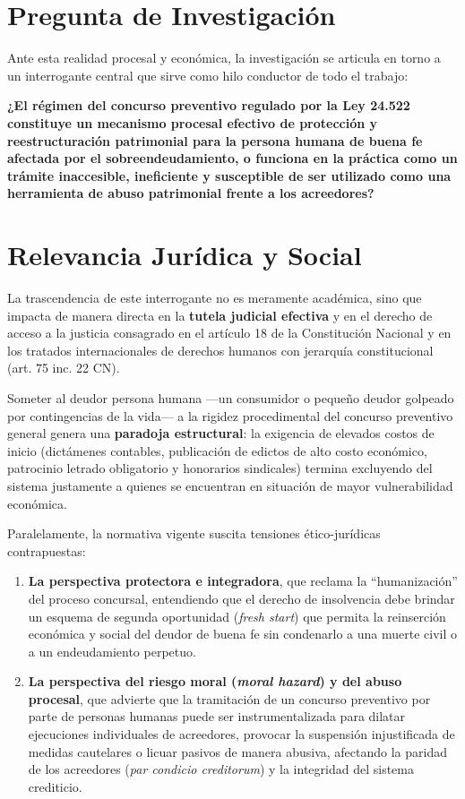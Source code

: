\documentclass[12pt,oneside]{book}
\begin{document}
\section{Pregunta de Investigación}

Ante esta realidad procesal y económica, la investigación se articula en torno a un interrogante central que sirve como hilo conductor de todo el trabajo:

\begin{important}
\textbf{¿El régimen del concurso preventivo regulado por la Ley 24.522 constituye un mecanismo procesal efectivo de protección y reestructuración patrimonial para la persona humana de buena fe afectada por el sobreendeudamiento, o funciona en la práctica como un trámite inaccesible, ineficiente y susceptible de ser utilizado como una herramienta de abuso patrimonial frente a los acreedores?}
\end{important}

\section{Relevancia Jurídica y Social}

La trascendencia de este interrogante no es meramente académica, sino que impacta de manera directa en la \textbf{tutela judicial efectiva} y en el derecho de acceso a la justicia consagrado en el artículo 18 de la Constitución Nacional y en los tratados internacionales de derechos humanos con jerarquía constitucional (art. 75 inc. 22 CN).

Someter al deudor persona humana ---un consumidor o pequeño deudor golpeado por contingencias de la vida--- a la rigidez procedimental del concurso preventivo general genera una \textbf{paradoja estructural}: la exigencia de elevados costos de inicio (dictámenes contables, publicación de edictos de alto costo económico, patrocinio letrado obligatorio y honorarios sindicales) termina excluyendo del sistema justamente a quienes se encuentran en situación de mayor vulnerabilidad económica.

Paralelamente, la normativa vigente suscita tensiones ético-jurídicas contrapuestas:

\begin{enumerate}
    \item \textbf{La perspectiva protectora e integradora}, que reclama la ``humanización'' del proceso concursal, entendiendo que el derecho de insolvencia debe brindar un esquema de segunda oportunidad (\textit{fresh start}) que permita la reinserción económica y social del deudor de buena fe sin condenarlo a una muerte civil o a un endeudamiento perpetuo.

    \item \textbf{La perspectiva del riesgo moral (\textit{moral hazard}) y del abuso procesal}, que advierte que la tramitación de un concurso preventivo por parte de personas humanas puede ser instrumentalizada para dilatar ejecuciones individuales de acreedores, provocar la suspensión injustificada de medidas cautelares o licuar pasivos de manera abusiva, afectando la paridad de los acreedores (\textit{par condicio creditorum}) y la integridad del sistema crediticio.
\end{enumerate}
\end{document}
